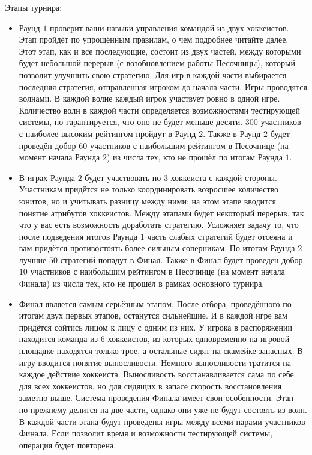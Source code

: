 Этапы турнира:
\begin{itemize}
  \item Раунд $1$ проверит ваши навыки управления командой из двух хоккеистов. Этап пройдёт по упрощённым правилам, о чем подробнее читайте
        далее. Этот этап, как и все последующие, состоит из двух частей, между которыми будет небольшой перерыв (с возобновлением работы
        Песочницы), который позволит улучшить свою стратегию. Для игр в каждой части выбирается последняя стратегия, отправленная игроком
        до начала части. Игры проводятся волнами. В каждой волне каждый игрок участвует ровно в одной игре. Количество волн в каждой части
        определяется возможностями тестирующей системы, но гарантируется, что оно не будет меньше десяти. $300$ участников с наиболее
        высоким рейтингом пройдут в Раунд $2$. Также в Раунд $2$ будет проведён добор $60$ участников с наибольшим рейтингом в Песочнице (на
        момент начала Раунда $2$) из числа тех, кто не прошёл по итогам Раунда $1$.
  \item В играх Раунда $2$ будет участвовать по $3$ хоккеиста с каждой стороны. Участникам придётся не только координировать возросшее
        количество юнитов, но и учитывать разницу между ними: на этом этапе вводится понятие атрибутов хоккеистов. Между этапами будет
        некоторый перерыв, так что у вас есть возможность доработать стратегию. Усложняет задачу то, что после подведения итогов Раунда $1$
        часть слабых стратегий будет отсеяна и вам придётся противостоять более сильным соперникам. По итогам Раунда $2$ лучшие $50$
        стратегий попадут в Финал. Также в Финал будет проведен добор $10$ участников с наибольшим рейтингом в Песочнице (на момент начала
        Финала) из числа тех, кто не прошёл в рамках основного турнира.
  \item Финал является самым серьёзным этапом. После отбора, проведённого по итогам двух первых этапов, останутся сильнейшие. И в каждой
        игре вам придётся сойтись лицом к лицу с одним из них. У игрока в распоряжении находится команда из $6$ хоккеистов, из которых
        одновременно на игровой площадке находятся только трое, а остальные сидят на скамейке запасных. В игру вводится понятие выносливости.
        Немного выносливости тратится на каждое действие хоккеиста. Выносливость восстанавливается сама по себе для всех хоккеистов, но для
        сидящих в запасе скорость восстановления заметно выше. Система проведения Финала имеет свои особенности. Этап по-прежнему делится
        на две части, однако они уже не будут состоять из волн. В каждой части этапа будут проведены игры между всеми парами участников
        Финала. Если позволит время и возможности тестирующей системы, операция будет повторена.
\end{itemize}

